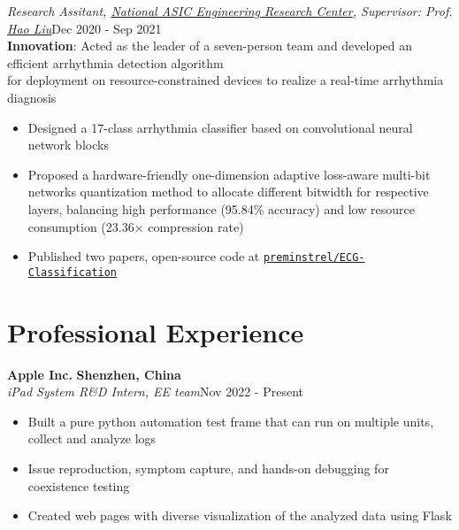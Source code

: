 \documentclass[letterpaper,11pt]{article}
\begin{document}
\textit{Research Assitant, {\href{https://electronic.seu.edu.cn/dz_en/11384/list.htm}{National ASIC Engineering Research Center}}, Supervisor: Prof. {\href{https://electronic.seu.edu.cn/lh/list.htm}{Hao Liu}}}\hfill{Dec 2020 - Sep 2021}\\


\textbf{Innovation}: Acted as the leader of a seven-person team and developed an efficient arrhythmia detection algorithm\\
\hspace{63pt} for deployment on resource-constrained devices to realize a real-time arrhythmia diagnosis
\begin{itemize}
    \item Designed a 17-class arrhythmia classifier based on convolutional neural network blocks
    \item Proposed a hardware-friendly one-dimension adaptive loss-aware multi-bit networks quantization method to allocate different bitwidth for respective layers, balancing high performance (95.84\% accuracy) and low resource consumption (23.36$\times$ compression rate)
    \item Published two papers, open-source code at \href{https://preminstrel.github.io/ECG-Classification/}{\faGithub \hspace{0em} \texttt{preminstrel/ECG-Classification}}
\end{itemize}
\vspace{-6pt}
\section{\textbf{Professional Experience}}
{\bf Apple Inc.}  \hfill{\textbf{Shenzhen, China} }\\
\textit{iPad System R\&D Intern, EE team}\hfill{Nov 2022 - Present}\\

\begin{itemize}
    \item Built a pure python automation test frame that can run on multiple units, collect and analyze logs
    \item Issue reproduction, symptom capture, and hands-on debugging for coexistence testing
    \item Created web pages with diverse visualization of the analyzed data using Flask
\end{itemize}
\vspace{-9pt}
\end{document}
